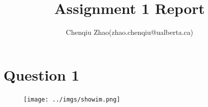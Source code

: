\documentclass[UTF8]{article}
\title{Assignment 1 Report}
\author{Chenqiu Zhao(zhao.chenqiu@ualberta.ca)}
\date{}
\begin{document}
\maketitle






% 






\section*{Question 1}
\begin{figure}
  \texttt{[image: ../imgs/showim.png]}
    \label{fig1}
\end{figure}
\end{document}
